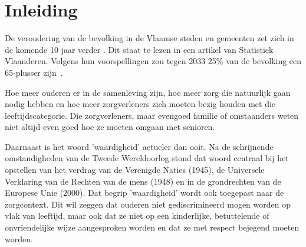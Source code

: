 \documentclass{hogent-article}
\affiliation{
  \textsuperscript{2} \href{mailto:sibian.degussem@student.hogent.be}{sibian.degussem@student.hogent.be}}
\affiliation{
    \textsuperscript{1} \href{mailto:jorrit.campens@student.hogent.be}{jorrit.campens@hogent.be}}
\begin{document}
\flushbottom %
\maketitle %
\tableofcontents %
\thispagestyle{empty} %


\section{Inleiding}\label{sec:inleiding}
De veroudering van de bevolking in de Vlaamse steden en gemeenten zet zich in de komende 10 jaar verder \textcite{StatistiekVlaanderen2018}. Dit staat te lezen in een artikel van Statistiek Vlaanderen. Volgens hun voorspellingen zou tegen 2033 25\% van de bevolking een 65-plusser zijn~\autocite{StatistiekVlaanderen2018}.

Hoe meer ouderen er in de samenleving zijn, hoe meer zorg die natuurlijk gaan nodig hebben en hoe meer zorgverleners zich moeten bezig houden met die leeftijdscategorie. Die zorgverleners, maar evengoed familie of omstaanders weten niet altijd even goed hoe ze moeten omgaan met senioren.

Daarnaast is het woord 'waardigheid' actueler dan ooit. Na de schrijnende omstandigheden van de Tweede Wereldoorlog stond dat woord centraal bij het opstellen van het verdrag van de Verenigde Naties (1945), de Universele Verklaring van de Rechten van de mens (1948) en in de grondrechten van de Europese Unie (2000). Dat begrip 'waardigheid' wordt ook toegepast naar de zorgcontext. Dit wil zeggen dat ouderen niet gediscrimineerd mogen worden op vlak van leeftijd, maar ook dat ze niet op een kinderlijke, betuttelende of onvriendelijke wijze aangesproken worden en dat ze met respect bejegend moeten worden.~\autocite{Campens}
\end{document}
